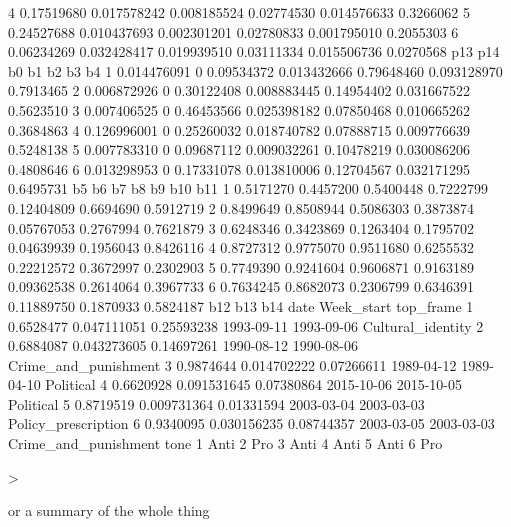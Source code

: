 \documentclass{article}
\begin{document}
\begin{Schunk}
\begin{Soutput}
4 0.17519680 0.017578242 0.008185524 0.02774530 0.014576633 0.3266062
5 0.24527688 0.010437693 0.002301201 0.02780833 0.001795010 0.2055303
6 0.06234269 0.032428417 0.019939510 0.03111334 0.015506736 0.0270568
          p13 p14         b0          b1         b2          b3        b4
1 0.014476091   0 0.09534372 0.013432666 0.79648460 0.093128970 0.7913465
2 0.006872926   0 0.30122408 0.008883445 0.14954402 0.031667522 0.5623510
3 0.007406525   0 0.46453566 0.025398182 0.07850468 0.010665262 0.3684863
4 0.126996001   0 0.25260032 0.018740782 0.07888715 0.009776639 0.5248138
5 0.007783310   0 0.09687112 0.009032261 0.10478219 0.030086206 0.4808646
6 0.013298953   0 0.17331078 0.013810006 0.12704567 0.032171295 0.6495731
         b5        b6        b7        b8         b9       b10       b11
1 0.5171270 0.4457200 0.5400448 0.7222799 0.12404809 0.6694690 0.5912719
2 0.8499649 0.8508944 0.5086303 0.3873874 0.05767053 0.2767994 0.7621879
3 0.6248346 0.3423869 0.1263404 0.1795702 0.04639939 0.1956043 0.8426116
4 0.8727312 0.9775070 0.9511680 0.6255532 0.22212572 0.3672997 0.2302903
5 0.7749390 0.9241604 0.9606871 0.9163189 0.09362538 0.2614064 0.3967733
6 0.7634245 0.8682073 0.2306799 0.6346391 0.11889750 0.1870933 0.5824187
        b12         b13        b14       date Week_start            top_frame
1 0.6528477 0.047111051 0.25593238 1993-09-11 1993-09-06    Cultural_identity
2 0.6884087 0.043273605 0.14697261 1990-08-12 1990-08-06 Crime_and_punishment
3 0.9874644 0.014702222 0.07266611 1989-04-12 1989-04-10            Political
4 0.6620928 0.091531645 0.07380864 2015-10-06 2015-10-05            Political
5 0.8719519 0.009731364 0.01331594 2003-03-04 2003-03-03  Policy_prescription
6 0.9340095 0.030156235 0.08744357 2003-03-05 2003-03-03 Crime_and_punishment
  tone
1 Anti
2  Pro
3 Anti
4 Anti
5 Anti
6  Pro
\end{Soutput}
\begin{Sinput}
> 
\end{Sinput}
\end{Schunk}

or a summary of the whole thing
\end{document}
